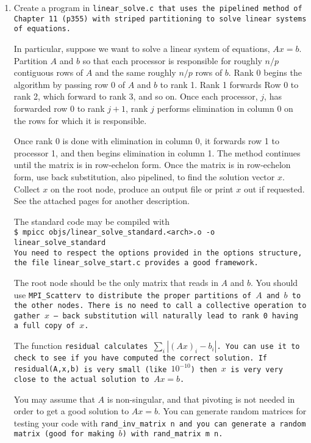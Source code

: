 \documentclass{article}
\begin{document}
\begin{enumerate}
\item Create a program in \tt{linear\_solve.c} that uses the pipelined
  method of Chapter 11 (p355) with striped partitioning to solve
  linear systems of equations.  

In particular, suppose we want to solve a linear system of equations,
$Ax=b$.  Partition $A$ and $b$ so that each processor is responsible
for roughly $n/p$ contiguous rows of $A$ and the same roughly $n/p$
rows of $b$.  Rank 0 begins the algorithm by passing row 0 of $A$ and
$b$ to rank 1. Rank 1 forwards Row 0 to rank 2, which forward to rank
3, and so on.  Once each processor, $j$,  has forwarded row 0 to rank
$j+1$, rank $j$ performs elimination in column 0 on the rows for which
it is responsible.  

Once rank 0 is done with elimination in column 0, it forwards row 1 to
processor 1, and then begins elimination in column 1.  The method
continues until the matrix is in row-echelon form.  Once the matrix is
in row-echelon form, use back substitution, also pipelined, to find
the solution vector $x$.   Collect $x$ on the root node, produce an
output file or print $x$ out if requested.  See the attached pages for
another description. 

The standard code may be compiled with\\
\tt{\$ mpicc objs/linear\_solve\_standard.<arch>.o -o
  linear\_solve\_standard}\\

You need to respect the options provided in the \tt{options}
structure, the file \tt{linear\_solve\_start.c} provides a good
framework.  

The root node should be the only matrix that reads in $A$ and $b$. You
should use \tt{MPI\_Scatterv} to distribute the proper partitions of
$A$ and $b$ to the other nodes. There is no need to call a collective
operation to gather $x$ -- back substitution will naturally lead to
rank 0 having a full copy of $x$. 

The function \tt{residual} calculates $\sum_i
\left|(Ax)_i-b_i\right|$.  You can use it to check to see if you have
computed the correct solution.  If \tt{residual(A,x,b)} is very small
(like $10^{-10}$) then $x$ is very very close to the actual solution to
$Ax=b$.  

You may assume that $A$ is non-singular, and that pivoting is not
needed in order to get a good solution to $Ax=b$.  You can generate
random matrices for testing your code with \tt{rand\_inv\_matrix n}
and you can generate a random matrix (good for making $b$) with
\tt{rand\_matrix m n}. 


\end{enumerate}
\end{document}
